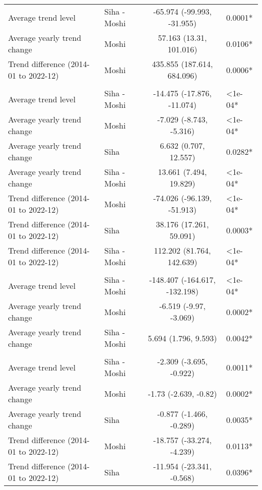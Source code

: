 \begin{longtable}{l|lcl}
\midrule\addlinespace[2.5pt]
Average trend level & Siha - Moshi & -65.974 (-99.993, -31.955) & 0.0001* \\ 
Average yearly trend change & Moshi & 57.163 (13.31, 101.016) & 0.0106* \\ 
Trend difference (2014-01 to 2022-12) & Moshi & 435.855 (187.614, 684.096) & 0.0006* \\ 
\midrule\addlinespace[2.5pt]
\multicolumn{4}{l}{Poisoning} \\ 
\midrule\addlinespace[2.5pt]
Average trend level & Siha - Moshi & -14.475 (-17.876, -11.074) & <1e-04* \\ 
Average yearly trend change & Moshi & -7.029 (-8.743, -5.316) & <1e-04* \\ 
Average yearly trend change & Siha & 6.632 (0.707, 12.557) & 0.0282* \\ 
Average yearly trend change & Siha - Moshi & 13.661 (7.494, 19.829) & <1e-04* \\ 
Trend difference (2014-01 to 2022-12) & Moshi & -74.026 (-96.139, -51.913) & <1e-04* \\ 
Trend difference (2014-01 to 2022-12) & Siha & 38.176 (17.261, 59.091) & 0.0003* \\ 
Trend difference (2014-01 to 2022-12) & Siha - Moshi & 112.202 (81.764, 142.639) & <1e-04* \\ 
\midrule\addlinespace[2.5pt]
\multicolumn{4}{l}{Psychoses} \\ 
\midrule\addlinespace[2.5pt]
Average trend level & Siha - Moshi & -148.407 (-164.617, -132.198) & <1e-04* \\ 
Average yearly trend change & Moshi & -6.519 (-9.97, -3.069) & 0.0002* \\ 
Average yearly trend change & Siha - Moshi & 5.694 (1.796, 9.593) & 0.0042* \\ 
\midrule\addlinespace[2.5pt]
\multicolumn{4}{l}{Schistosomiasis} \\ 
\midrule\addlinespace[2.5pt]
Average trend level & Siha - Moshi & -2.309 (-3.695, -0.922) & 0.0011* \\ 
Average yearly trend change & Moshi & -1.73 (-2.639, -0.82) & 0.0002* \\ 
Average yearly trend change & Siha & -0.877 (-1.466, -0.289) & 0.0035* \\ 
Trend difference (2014-01 to 2022-12) & Moshi & -18.757 (-33.274, -4.239) & 0.0113* \\ 
Trend difference (2014-01 to 2022-12) & Siha & -11.954 (-23.341, -0.568) & 0.0396* \\ 

\end{longtable}
